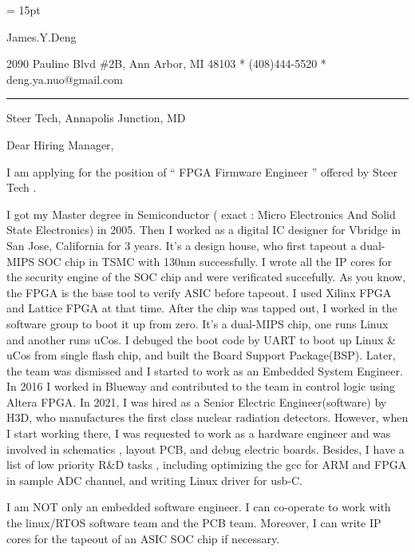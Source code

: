 

  \FFrg \baselineskip = 15pt

{
James.Y.Deng
}

{ 
2090 Pauline Blvd \#2B, Ann Arbor, MI 48103
*
(408)444-5520
*
deng.ya.nuo@gmail.com
}

{ \smallbreak } 

{\par\noindent\hrule} 

{ \bigbreak } 



Steer Tech, 
Annapolis Junction, MD


{ \bigbreak } 
{ 
Dear Hiring Manager,
}

{ \bigbreak } 
I am applying for the position of `` 
FPGA Firmware Engineer
'' offered by Steer Tech .

{ \bigbreak } 
I got my Master degree in Semiconductor ( exact : Micro Electronics And Solid State Electronics) in 2005.
Then I worked as a digital IC designer for Vbridge in San Jose, California for 3 years.
It's a design house, who first tapeout a dual-MIPS SOC chip in TSMC with 130nm successfully.
I wrote all the IP cores for the security engine of the SOC chip and were verificated succefully.
As you know, the FPGA is the base tool to verify ASIC before tapeout.
I used Xilinx FPGA and Lattice FPGA at that time.
After the chip was tapped out, I worked in the software group to boot it up from zero.
It's a dual-MIPS chip, one runs Linux and another runs uCos.
I debuged the boot code by UART to boot up Linux \& uCos from single flash chip,
and built the Board Support Package(BSP).
Later, the team was dismissed and I started to work as an Embedded System Engineer.
In 2016 I worked in Blueway and contributed to the team in control logic using Altera FPGA.
In 2021, I was hired as a Senior Electric Engineer(software) by H3D, 
who manufactures the first class nuclear radiation detectors.
However, when I start working there, I was requested to work as
a hardware engineer and was involved in schematics , layout PCB, and debug electric boards.
Besides, I have a list of low priority R\&D tasks , 
including optimizing the gcc for ARM and FPGA in sample ADC channel,
and writing Linux driver for usb-C.

{ \bigbreak } 
I am NOT only an embedded software engineer. 
I can co-operate to work with the linux/RTOS software team and the PCB team.
Moreover, I can write IP cores for the tapeout of an ASIC SOC chip if necessary.


